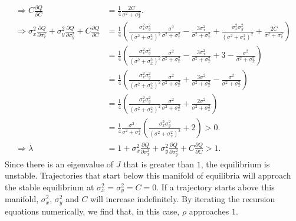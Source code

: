\documentclass{article}
\begin{document}
\begin{enumerate}
\begin{align*}
\\ \Rightarrow C\frac{\partial Q}{\partial C}&=\frac{1}{4}\frac{2C}{\sigma^2+\sigma_x^2}.
\\ \Rightarrow \sigma_x^2\frac{\partial Q}{\partial \sigma_x^2}+\sigma_y^2\frac{\partial Q}{\partial \sigma_y^2}+C\frac{\partial Q}{\partial C}&=\frac{1}{4}\left(\frac{\sigma_x^2\sigma_y^2}{(\sigma^2+\sigma_x^2)^2}\frac{\sigma^2}{\sigma^2+\sigma_x^2}-\frac{3\sigma_x^2}{\sigma^2+\sigma_x^2}+\frac{\sigma_x^2\sigma_y^2}{(\sigma^2+\sigma_x^2)^2}+\frac{2C}{\sigma^2+\sigma_x^2}\right)
\\ &=\frac{1}{4}\left(\frac{\sigma_x^2\sigma_y^2}{(\sigma^2+\sigma_x^2)^2}\frac{\sigma^2}{\sigma^2+\sigma_x^2}-\frac{3\sigma_x^2}{\sigma^2+\sigma_x^2}+3-\frac{\sigma^2}{\sigma^2+\sigma_x^2}\right)
\\&=\frac{1}{4}\left(\frac{\sigma_x^2\sigma_y^2}{(\sigma^2+\sigma_x^2)^2}\frac{\sigma^2}{\sigma^2+\sigma_x^2}+\frac{3\sigma^2}{\sigma^2+\sigma_x^2}-\frac{\sigma^2}{\sigma^2+\sigma_x^2}\right)
\\&=\frac{1}{4}\left(\frac{\sigma_x^2\sigma_y^2}{(\sigma^2+\sigma_x^2)^2}\frac{\sigma^2}{\sigma^2+\sigma_x^2}+\frac{2\sigma^2}{\sigma^2+\sigma_x^2}\right)
\\&=\frac{1}{4}\frac{\sigma^2}{\sigma^2+\sigma_x^2}\left(\frac{\sigma_x^2\sigma_y^2}{(\sigma^2+\sigma_x^2)^2}+2\right)>0.
\\ \Rightarrow \lambda &=1+\sigma_x^2\frac{\partial Q}{\partial \sigma_x^2}+\sigma_y^2\frac{\partial Q}{\partial \sigma_y^2}+C\frac{\partial Q}{\partial C}>1.
\end{align*}
Since there is an eigenvalue of $J$ that is greater than $1$, the equilibrium is unstable. Trajectories that start below this manifold of equilibria will approach the stable equilibrium at $\sigma_x^2=\sigma_y^2=C=0$. If a trajectory starts above this manifold, $\sigma_x^2$, $\sigma_y^2$ and $C$ will increase indefinitely. By iterating the recursion equations numerically, we find that, in this case, $\rho$ approaches $1$.


\end{enumerate}
\end{document}
